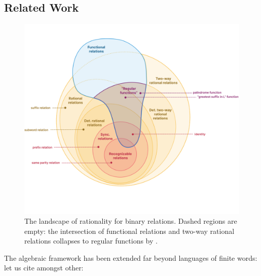 \subsection{Related Work}

\begin{figure}[htb]
	\centering
	\includegraphics[width=\linewidth]{fig/algebra/landscape.png}
	\caption{
		\AP\label{fig:landscape-rationality} The landscape of rationality for binary relations.
		Dashed regions are empty: the intersection of
		functional relations and two-way rational relations
		collapses to regular functions by
		\cite[Theorem 22, p.~243]{EH2001transduction}.
	}
\end{figure}
The algebraic framework has been extended far beyond languages of finite words: let us cite amongst other:
